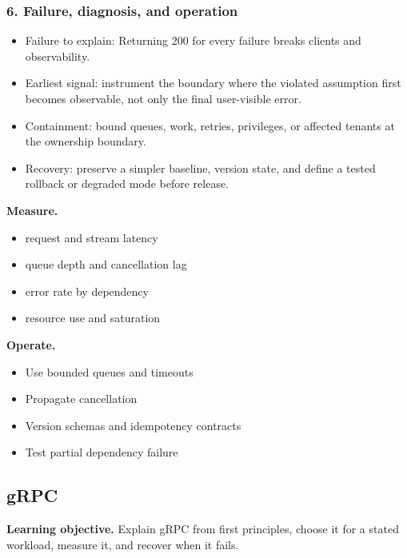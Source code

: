 \subsubsection*{6. Failure, diagnosis, and operation}
\begin{itemize}
\item Failure to explain: Returning 200 for every failure breaks clients and observability.
\item Earliest signal: instrument the boundary where the violated assumption first becomes observable, not only the final user-visible error.
\item Containment: bound queues, work, retries, privileges, or affected tenants at the ownership boundary.
\item Recovery: preserve a simpler baseline, version state, and define a tested rollback or degraded mode before release.
\end{itemize}
\textbf{Measure.}\begin{itemize}
\item request and stream latency
\item queue depth and cancellation lag
\item error rate by dependency
\item resource use and saturation
\end{itemize}
\textbf{Operate.}\begin{itemize}
\item Use bounded queues and timeouts
\item Propagate cancellation
\item Version schemas and idempotency contracts
\item Test partial dependency failure
\end{itemize}
\subsection{gRPC}
\textbf{Learning objective.} Explain gRPC from first principles, choose it for a stated workload, measure it, and recover when it fails.
